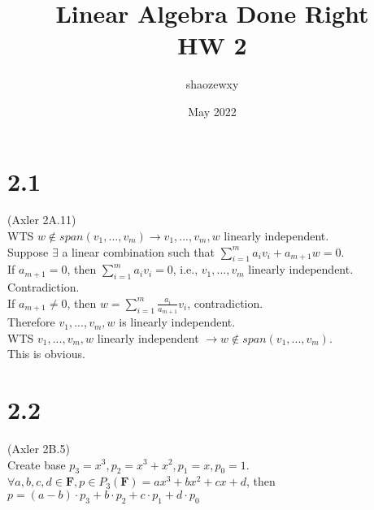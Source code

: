 \documentclass{article}
\title{Linear Algebra Done Right\\
\large{HW 2}}
\author{shaozewxy }
\date{May 2022}
\begin{document}
\maketitle

\setcounter{secnumdepth}{0}
\section{2.1}
(Axler 2A.11)\\
WTS $w \notin span(v_1, ..., v_m) \rightarrow v_1, ..., v_m, w$ linearly independent.\\
Suppose $\exists$ a linear combination such that $\sum_{i=1}^{m} a_iv_i + a_{m+1}w = 0$.\\
If $a_{m+1} = 0$, then $\sum_{i=1}^{m} a_iv_i = 0$, i.e., $v_1, ..., v_m$ linearly independent. Contradiction.\\
If $a_{m+1} \neq 0$, then $w = \sum_{i=1}^{m} \frac{a_i}{a_{m+1}}v_i$, contradiction.\\
Therefore $v_1, ..., v_m, w$ is linearly independent.\\
WTS $v_1,...,v_m,w$ linearly independent $\rightarrow w \notin span(v_1,..., v_m)$.\\
This is obvious.
\section{2.2}
(Axler 2B.5)\\
Create base $p_3 = x^3, p_2 = x^3+x^2, p_1 = x, p_0 = 1$.\\
$\forall a,b,c,d \in \textbf{F}, p \in P_3(\textbf{F}) = ax^3 + bx^2 + cx + d$, then $p = (a-b)\cdot p_3 + b\cdot p_2 + c\cdot p_1 + d\cdot p_0$
\end{document}
